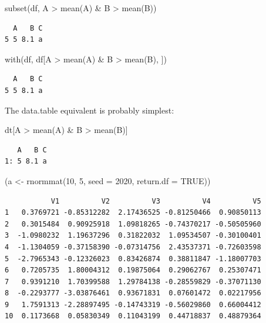 \documentclass[
]{book}
\newenvironment{Shaded}{\begin{snugshade}}{\end{snugshade}}
\newcommand{\AttributeTok}[1]{\textcolor[rgb]{0.77,0.63,0.00}{#1}}
\newcommand{\ConstantTok}[1]{\textcolor[rgb]{0.00,0.00,0.00}{#1}}
\newcommand{\DecValTok}[1]{\textcolor[rgb]{0.00,0.00,0.81}{#1}}
\newcommand{\FunctionTok}[1]{\textcolor[rgb]{0.00,0.00,0.00}{#1}}
\newcommand{\NormalTok}[1]{#1}
\newcommand{\OtherTok}[1]{\textcolor[rgb]{0.56,0.35,0.01}{#1}}
\newcommand{\SpecialCharTok}[1]{\textcolor[rgb]{0.00,0.00,0.00}{#1}}
\begin{document}
\begin{Shaded}
\begin{Highlighting}[]
\FunctionTok{subset}\NormalTok{(df, A }\SpecialCharTok{\textgreater{}} \FunctionTok{mean}\NormalTok{(A) }\SpecialCharTok{\&}\NormalTok{ B }\SpecialCharTok{\textgreater{}} \FunctionTok{mean}\NormalTok{(B))}
\end{Highlighting}
\end{Shaded}

\begin{verbatim}
  A   B C
5 5 8.1 a
\end{verbatim}

\begin{Shaded}
\begin{Highlighting}[]
\FunctionTok{with}\NormalTok{(df, df[A }\SpecialCharTok{\textgreater{}} \FunctionTok{mean}\NormalTok{(A) }\SpecialCharTok{\&}\NormalTok{ B }\SpecialCharTok{\textgreater{}} \FunctionTok{mean}\NormalTok{(B), ])}
\end{Highlighting}
\end{Shaded}

\begin{verbatim}
  A   B C
5 5 8.1 a
\end{verbatim}

The data.table equivalent is probably simplest:

\begin{Shaded}
\begin{Highlighting}[]
\NormalTok{dt[A }\SpecialCharTok{\textgreater{}} \FunctionTok{mean}\NormalTok{(A) }\SpecialCharTok{\&}\NormalTok{ B }\SpecialCharTok{\textgreater{}} \FunctionTok{mean}\NormalTok{(B)]}
\end{Highlighting}
\end{Shaded}

\begin{verbatim}
   A   B C
1: 5 8.1 a
\end{verbatim}

\begin{Shaded}
\begin{Highlighting}[]
\NormalTok{(a }\OtherTok{\textless{}{-}} \FunctionTok{rnormmat}\NormalTok{(}\DecValTok{10}\NormalTok{, }\DecValTok{5}\NormalTok{, }\AttributeTok{seed =} \DecValTok{2020}\NormalTok{, }\AttributeTok{return.df =} \ConstantTok{TRUE}\NormalTok{))}
\end{Highlighting}
\end{Shaded}

\begin{verbatim}
           V1          V2          V3          V4          V5
1   0.3769721 -0.85312282  2.17436525 -0.81250466  0.90850113
2   0.3015484  0.90925918  1.09818265 -0.74370217 -0.50505960
3  -1.0980232  1.19637296  0.31822032  1.09534507 -0.30100401
4  -1.1304059 -0.37158390 -0.07314756  2.43537371 -0.72603598
5  -2.7965343 -0.12326023  0.83426874  0.38811847 -1.18007703
6   0.7205735  1.80004312  0.19875064  0.29062767  0.25307471
7   0.9391210  1.70399588  1.29784138 -0.28559829 -0.37071130
8  -0.2293777 -3.03876461  0.93671831  0.07601472  0.02217956
9   1.7591313 -2.28897495 -0.14743319 -0.56029860  0.66004412
10  0.1173668  0.05830349  0.11043199  0.44718837  0.48879364
\end{verbatim}
\end{document}
